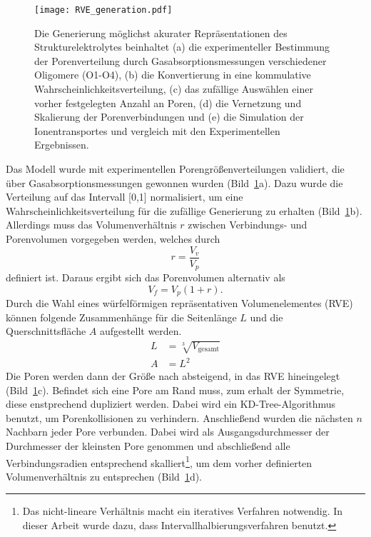 \begin{figure}[!h]
        \center
		\texttt{[image: RVE\_generation.pdf]}
		\caption{\label{fig:sphere_cylinder_model_RVE_generation}Die Generierung möglichst akurater Repräsentationen des Strukturelektrolytes beinhaltet (a) die experimenteller Bestimmung der Porenverteilung durch Gasabsorptionsmessungen verschiedener Oligomere (O1-O4), (b) die Konvertierung in eine kommulative Wahrscheinlichkeitsverteilung, (c) das zufällige Auswählen einer vorher festgelegten Anzahl an Poren, (d) die Vernetzung und Skalierung der Porenverbindungen und (e) die Simulation der Ionentransportes und vergleich mit den Experimentellen Ergebnissen.
        }
\end{figure}

Das Modell wurde mit experimentellen Porengrößenverteilungen validiert, die über Gasabsorptionsmessungen gewonnen wurden (Bild~\ref{fig:sphere_cylinder_model_RVE_generation}a). Dazu wurde die Verteilung auf das Intervall [0,1] normalisiert, um eine Wahrscheinlichkeitsverteilung für die zufällige Generierung zu erhalten (Bild~\ref{fig:sphere_cylinder_model_RVE_generation}b). Allerdings muss das Volumenverhältnis $r$ zwischen Verbindungs- und Porenvolumen vorgegeben werden, welches durch
\begin{equation}
r = \frac{V_v}{V_p}
\end{equation}
definiert ist.
Daraus ergibt sich das Porenvolumen alternativ als
\begin{equation}
V_f = V_p (1 + r).
\end{equation}
Durch die Wahl eines würfelförmigen repräsentativen Volumenelementes (RVE) können folgende Zusammenhänge für die Seitenlänge $L$ und die Querschnittsfläche $A$ aufgestellt werden.
\begin{align}
L &= \sqrt[3]{V_{\text{gesamt}}} \\
A &= L^2
\end{align}
Die Poren werden dann der Größe nach absteigend, in das RVE hineingelegt (Bild~\ref{fig:sphere_cylinder_model_RVE_generation}c). Befindet sich eine Pore am Rand muss, zum erhalt der Symmetrie, diese enstprechend dupliziert werden. Dabei wird ein KD-Tree-Algorithmus benutzt, um Porenkollisionen zu verhindern. Anschließend wurden die nächsten $n$ Nachbarn jeder Pore verbunden. Dabei wird als Ausgangsdurchmesser der Durchmesser der kleinsten Pore genommen und abschließend alle Verbindungsradien entsprechend skalliert\footnote{Das nicht-lineare Verhältnis macht ein iteratives Verfahren notwendig. In dieser Arbeit wurde dazu, dass Intervallhalbierungsverfahren benutzt.}, um dem vorher definierten Volumenverhältnis zu entsprechen (Bild~\ref{fig:sphere_cylinder_model_RVE_generation}d).
